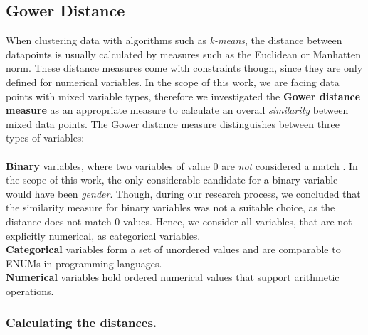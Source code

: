\documentclass[runningheads]{llncs}
\begin{document}
	\subsection{Gower Distance}\label{gower}
	
	When clustering data with algorithms such as \textit{k-means}, the distance between datapoints is usually calculated by measures such as the Euclidean or Manhatten norm. These distance measures come with constraints though, since they are only defined for numerical variables. In the scope of this work, we are facing data points with mixed variable types, therefore we investigated the \textbf{Gower distance measure} as an appropriate measure to calculate an overall \textit{similarity} between mixed data points. The Gower distance measure distinguishes between three types of variables:\\
	\\ \textbf{Binary} variables, where two variables of value 0 are \textit{not} considered a match \cite{gower1971general}. In the scope of this work, the only considerable candidate for a binary variable would have been \textit{gender}. Though, during our research process, we concluded that the similarity measure for binary variables was not a suitable choice, as the distance does not match 0 values. Hence, we consider all variables, that are not explicitly numerical, as categorical variables.\\
	\textbf{Categorical} variables form a set of unordered values and are comparable to ENUMs in programming languages.\\	
	\textbf{Numerical} variables hold ordered numerical values that support arithmetic operations.
	
	\subsubsection{Calculating the distances.}
	
\end{document}

